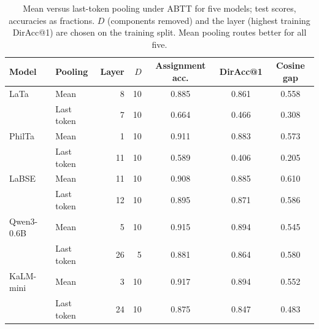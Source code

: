 \begin{table}[t]
\centering
\small
\setlength{\tabcolsep}{6pt}
\begin{tabular}{llrrccc}
\toprule
Model & Pooling & Layer & $D$ & Assignment acc. & DirAcc@1 & Cosine gap \\
\midrule
LaTa & Mean & 8 & 10 & 0.885 & 0.861 & 0.558 \\
 & Last token & 7 & 10 & 0.664 & 0.466 & 0.308 \\
\midrule
PhilTa & Mean & 1 & 10 & 0.911 & 0.883 & 0.573 \\
 & Last token & 11 & 10 & 0.589 & 0.406 & 0.205 \\
\midrule
LaBSE & Mean & 11 & 10 & 0.908 & 0.885 & 0.610 \\
 & Last token & 12 & 10 & 0.895 & 0.871 & 0.586 \\
\midrule
Qwen3-0.6B & Mean & 5 & 10 & 0.915 & 0.894 & 0.545 \\
 & Last token & 26 & 5 & 0.881 & 0.864 & 0.580 \\
\midrule
KaLM-mini & Mean & 3 & 10 & 0.917 & 0.894 & 0.552 \\
 & Last token & 24 & 10 & 0.875 & 0.847 & 0.483 \\
\bottomrule
\end{tabular}
\caption{Mean versus last-token pooling under ABTT for five models; test scores, accuracies as fractions. $D$ (components removed) and the layer (highest training DirAcc@1) are chosen on the training split. Mean pooling routes better for all five.}
\label{tab:lasttok_comparison}
\end{table}
